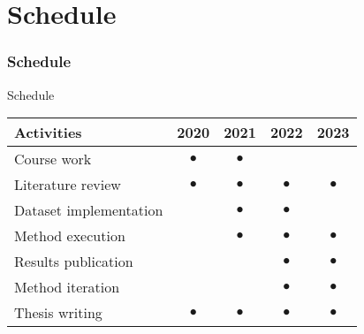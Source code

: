 \section{Schedule}


\begin{frame}{}
    \frametitle{Schedule}
\end{frame}


\begin{frame}{Schedule}
    \begin{table}[]
        \centering

        \renewcommand{\arraystretch}{1.5}
        \setlength{\tabcolsep}{10pt}
        
        {
            \begin{tabular}{lcccc}
                \toprule 
                \textbf{Activities} & \textbf{2020} & \textbf{2021} & \textbf{2022} & \textbf{2023} \\
                \midrule
                Course work & $\bullet$ & $\bullet$ & & \\
                Literature review & $\bullet$ & $\bullet$ & $\bullet$ & $\bullet$ \\
                Dataset implementation & & $\bullet$ & $\bullet$ & \\
                Method execution & & $\bullet$ & $\bullet$ & $\bullet$ \\
                Results publication & & & $\bullet$ & $\bullet$ \\
                Method iteration & & & $\bullet$ & $\bullet$ \\
                Thesis writing & $\bullet$ & $\bullet$ & $\bullet$ & $\bullet$
            \end{tabular}
        }
    \end{table}
\end{frame}
